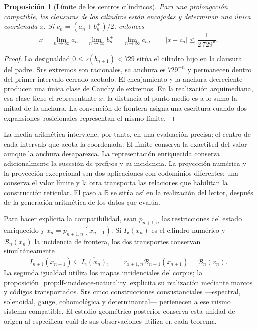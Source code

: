\documentclass[a4paper,10pt]{article}
\newtheorem{proposition}[theorem]{Proposición}
\theoremstyle{definition}\newtheorem{definition}[theorem]{Definición}
\theoremstyle{remark}\newtheorem{remark}[theorem]{Observación}
\newcommand{\RR}{\mathbb R}\newcommand{\QQ}{\mathbb Q}
\numberwithin{equation}{section}
\begin{document}
\begin{proposition}[Límite de los centros cilíndricos]
Para una prolongación compatible, las clausuras de los cilindros están
encajadas y determinan una única coordenada \(x\). Si
\(c_n=(a_n+b_n^+)/2\), entonces
\[
 x=\lim_{n\to\infty}a_n=\lim_{n\to\infty}b_n^+
 =\lim_{n\to\infty}c_n,\qquad
 |x-c_n|\leq\frac1{2\,729^n}.
\]
\end{proposition}
\begin{proof}
La desigualdad \(0\leq\nu(b_{n+1})<729\) sitúa el cilindro hijo en
la clausura del padre. Sus extremos son racionales, su anchura es
\(729^{-n}\) y permanecen dentro del primer intervalo cerrado acotado.
El encajamiento y la anchura decreciente producen una única clase de
Cauchy de extremos. En la realización arquimediana, esa clase tiene el
representante \(x\); la distancia al punto medio es a lo sumo la mitad
de la anchura. La convención de frontera asigna una escritura cuando dos
expansiones posicionales representan el mismo límite.
\end{proof}

La media aritmética interviene, por tanto, en una evaluación precisa: el
centro de cada intervalo que acota la coordenada. El límite conserva la
exactitud del valor aunque la anchura desaparezca. La representación
enriquecida conserva adicionalmente la sucesión de prefijos y su incidencia.
La proyección numérica y la proyección excepcional son dos aplicaciones
con codominios diferentes; una conserva el valor límite y la otra transporta
las relaciones que habilitan la construcción reticular. El paso a
\(\RR\) se sitúa así en la realización del lector, después de la
generación aritmética de los datos que evalúa.

Para hacer explícita la compatibilidad, sean \(p_{n+1,n}\) las restricciones
del estado enriquecido y \(x_n=p_{n+1,n}(x_{n+1})\). Si \(I_n(x_n)\)
es el cilindro numérico y \(\mathcal B_n(x_n)\) la incidencia de frontera,
los dos transportes conservan simultáneamente
\[
 \overline{I_{n+1}(x_{n+1})}\subseteq\overline{I_n(x_n)},\qquad
 r_{n+1,n}\mathcal B_{n+1}(x_{n+1})=\mathcal B_n(x_n).
\]
La segunda igualdad utiliza los mapas incidenciales del corpus; la
proposición~\ref{prop:lf-incidence-naturality} explicita su realización
mediante marcos y códigos transportados. Sus cinco
construcciones consustanciales ---espectral, solenoidal, gauge, cohomológica
y determinantal--- pertenecen a ese mismo sistema compatible. El estudio
geométrico posterior conserva esta unidad de origen al especificar cuál
de sus observaciones utiliza en cada teorema.
\end{document}

